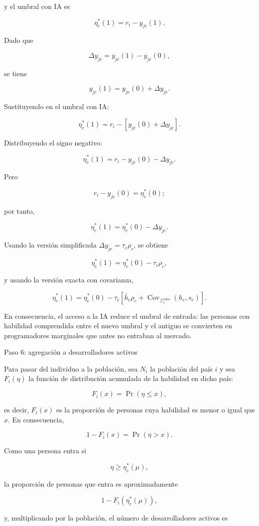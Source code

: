 \documentclass[12pt,a4paper]{article}
\let\textbf\textmd
\newcommand{\Zauto}{\mathcal{Z}^{\mathrm{auto}}_c}
\newcommand{\Covauto}{\operatorname{Cov}_{\Zauto}}
\begin{document}
y el umbral con IA es

\[
\eta_c^*(1)=r_i-y_{jc}(1).
\]

Dado que

\[
\Delta y_{jc}=y_{jc}(1)-y_{jc}(0),
\]

se tiene

\[
y_{jc}(1)=y_{jc}(0)+\Delta y_{jc}.
\]

Sustituyendo en el umbral con IA:

\[
\eta_c^*(1)=r_i-\left[y_{jc}(0)+\Delta y_{jc}\right].
\]

Distribuyendo el signo negativo:

\[
\eta_c^*(1)=r_i-y_{jc}(0)-\Delta y_{jc}.
\]

Pero

\[
r_i-y_{jc}(0)=\eta_c^*(0);
\]

por tanto,

\[
\eta_c^*(1)=\eta_c^*(0)-\Delta y_{jc}.
\]

Usando la versión simplificada $\Delta y_{jc}=\tau_c\rho_c$, se obtiene

\[
\eta_c^*(1)=\eta_c^*(0)-\tau_c\rho_c,
\]

y usando la versión exacta con covarianza,

\[
\eta_c^*(1)
=
\eta_c^*(0)
-\tau_c\left[\bar h_c\rho_c+\Covauto(h_c,s_c)\right].
\]

En consecuencia, el acceso a la IA reduce el umbral de entrada: las personas con habilidad comprendida entre el nuevo umbral y el antiguo se convierten en programadores marginales que antes no entraban al mercado.

\bigskip
\noindent\textbf{Paso 6: agregación a desarrolladores activos}

\medskip
\noindent Para pasar del individuo a la población, sea $N_i$ la población del país $i$ y sea $F_i(\eta)$ la función de distribución acumulada de la habilidad en dicho país:

\[
F_i(x)=\Pr(\eta\leq x),
\]

es decir, $F_i(x)$ es la proporción de personas cuya habilidad es menor o igual que $x$. En consecuencia,

\[
1-F_i(x)=\Pr(\eta>x).
\]

Como una persona entra si

\[
\eta\geq \eta_c^*(\mu),
\]

la proporción de personas que entra es aproximadamente

\[
1-F_i(\eta_c^*(\mu)),
\]

y, multiplicando por la población, el número de desarrolladores activos es
\end{document}
